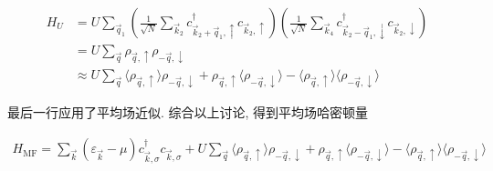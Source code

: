 \documentclass[../../main.tex]{subfiles}
\begin{document}
\begin{align*}
  H_{U} &= U\sum_{\vec{q}_{1}}\left(\frac{1}{\sqrt{N}}\sum_{\vec{k}_{2}} c^{\dagger}_{\vec{k}_{2} + \vec{q}_{1},\uparrow}c_{\vec{k}_{2},\uparrow}\right)\left(\frac{1}{\sqrt{N}}\sum_{\vec{k}_{4}} c^{\dagger}_{\vec{k}_{2} - \vec{q}_{1},\downarrow}c_{\vec{k}_{2},\downarrow}\right)\\
  &= U\sum_{\vec{q}}\rho_{\vec{q},\uparrow}\rho_{-\vec{q},\downarrow}\\
  &\approx U\sum_{\vec{q}}\langle \rho_{\vec{q},\uparrow}\rangle\rho_{-\vec{q},\downarrow} + \rho_{\vec{q},\uparrow}\langle\rho_{-\vec{q},\downarrow}\rangle - \langle\rho_{\vec{q},\uparrow}\rangle\langle\rho_{-\vec{q},\downarrow}\rangle
\end{align*}

最后一行应用了平均场近似. 综合以上讨论, 得到平均场哈密顿量

\begin{align*}
  H_{\text{MF}} = \sum_{\vec{k}}(\varepsilon_{\vec{k}} - \mu)c_{\vec{k},\sigma}^{\dagger}c_{\vec{k},\sigma} + U\sum_{\vec{q}}\langle \rho_{\vec{q},\uparrow}\rangle\rho_{-\vec{q},\downarrow} + \rho_{\vec{q},\uparrow}\langle\rho_{-\vec{q},\downarrow}\rangle - \langle\rho_{\vec{q},\uparrow}\rangle\langle\rho_{-\vec{q},\downarrow}\rangle
\end{align*}
\end{document}
